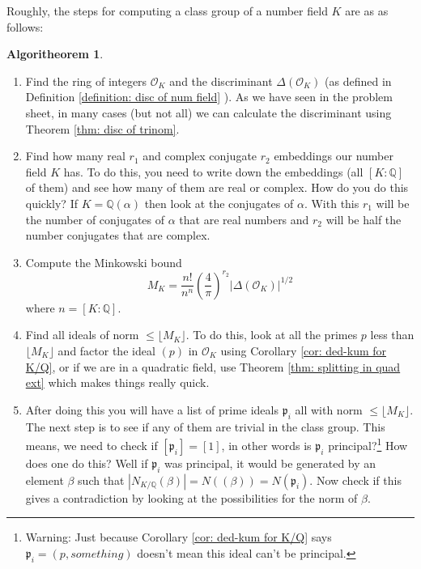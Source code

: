\documentclass[11pt,a4paper]{report}
\theoremstyle{plain}
\theoremstyle{definition}
\theoremstyle{definition}
\newtheorem{alg}[subsection]{Algoritheorem}
\def\QQ{\mathbb{Q}}
\def\gothp{\mathfrak{p}}
\def \a{\alpha}
\def \OO {\mathcal{O}}
\begin{document}
	
	
	Roughly, the steps for computing a class group of a number field $K$ are as as follows:
	
	\begin{alg}
		
		
		\begin{enumerate}
			\item Find the ring of integers $\OO_K$ and the discriminant $\Delta(\OO_K)$ (as defined in Definition \ref{definition: disc of num field} ). As we have seen in the problem sheet, in many cases (but not all) we can calculate the discriminant using Theorem \ref{thm: disc of trinom}.
			
			\item Find how many real $r_1$ and complex conjugate $r_2$ embeddings our number field $K$ has. To do this, you need to write down the embeddings (all $[K:\QQ]$ of them) and see how many of them are real or complex. How do you do this quickly? If $K=\QQ(\a)$ then look at the conjugates of $\a$. With this $r_1$ will be the number of conjugates of $\a$  that are real numbers and $r_2$ will be half  the number conjugates that are complex.
			
			\item Compute the Minkowski bound \[M_K= \frac{n!}{n^n} \left( \frac{4}{\pi} \right)^{r_2} |\Delta(\OO_K)|^{1/2}\] where $n=[K:\QQ]$.
			
			
			\item Find all ideals of norm $\leq \lfloor M_K \rfloor$. To do this, look at all the primes $p$ less than $\lfloor M_K \rfloor$ and factor the ideal $(p)$ in $\OO_K$ using Corollary \ref{cor: ded-kum for K/Q}, or if we are in a quadratic field, use Theorem \ref{thm: splitting in quad ext} which makes things really quick.
			
			\item After doing this you will have a list of prime ideals $\gothp_i$ all with norm $\leq \lfloor M_K \rfloor$. The next step is to see if any of them are trivial in the class group. This means, we need to check if $[\gothp_i]=[1]$, in other words is $\gothp_i$ principal?\footnote{Warning: Just because Corollary \ref{cor: ded-kum for K/Q} says $\gothp_i=(p,something)$ doesn't mean this ideal can't be principal.} How does one do this? Well if $\gothp_i$ was principal, it would be generated by an element $\beta$ such that $|N_{K/\QQ}(\beta)|=N((\beta))=N(\gothp_i)$. Now check if this gives a contradiction by looking at the possibilities for the norm of $\beta$.
			

\end{enumerate}
\end{alg}
\end{document}
